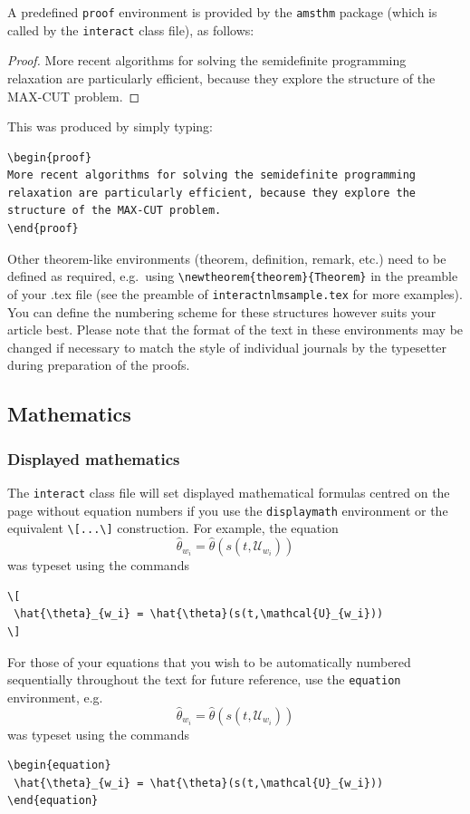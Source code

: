 \documentclass[]{interact}
\theoremstyle{plain}%
\theoremstyle{definition}
\theoremstyle{remark}
\begin{document}
A predefined \verb"proof" environment is provided by the \texttt{amsthm} package (which is called by the \texttt{interact} class file), as follows:
\begin{proof}
More recent algorithms for solving the semidefinite programming relaxation are particularly efficient, because they explore the structure of the MAX-CUT problem.
\end{proof}
\noindent This was produced by simply typing:
\begin{verbatim}
\begin{proof}
More recent algorithms for solving the semidefinite programming
relaxation are particularly efficient, because they explore the
structure of the MAX-CUT problem.
\end{proof}
\end{verbatim}
Other theorem-like environments (theorem, definition, remark, etc.) need to be defined as required, e.g.\ using \verb"\newtheorem{theorem}{Theorem}" in the preamble of your .tex file (see the preamble of \verb"interactnlmsample.tex" for more examples). You can define the numbering scheme for these structures however suits your article best. Please note that the format of the text in these environments may be changed if necessary to match the style of individual journals by the typesetter during preparation of the proofs.


\subsection{Mathematics}

\subsubsection{Displayed mathematics}

The \texttt{interact} class file will set displayed mathematical formulas centred on the page without equation numbers if you use the \texttt{displaymath} environment or the equivalent \verb"\[...\]" construction. For example, the equation
\[
 \hat{\theta}_{w_i} = \hat{\theta}(s(t,\mathcal{U}_{w_i}))
\]
was typeset using the commands
\begin{verbatim}
\[
 \hat{\theta}_{w_i} = \hat{\theta}(s(t,\mathcal{U}_{w_i}))
\]
\end{verbatim}

For those of your equations that you wish to be automatically numbered sequentially throughout the text for future reference, use the \texttt{equation} environment, e.g.
\begin{equation}
 \hat{\theta}_{w_i} = \hat{\theta}(s(t,\mathcal{U}_{w_i}))
\end{equation}
was typeset using the commands
\begin{verbatim}
\begin{equation}
 \hat{\theta}_{w_i} = \hat{\theta}(s(t,\mathcal{U}_{w_i}))
\end{equation}
\end{verbatim}
\end{document}
